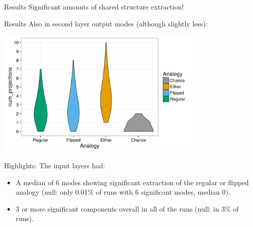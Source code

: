 \documentclass{beamer}
\begin{document}
\begin{frame}{Results}
Significant amounts of shared structure extraction!\\[11pt]
\end{frame}
\begin{frame}{Results}
Also in second layer output modes (although slightly less):
\begin{center}
\includegraphics[width=0.75\textwidth]{../hinton_family_tree/results/output_mode_projections_violin.png} 
\end{center}
\end{frame}

\begin{frame}{Highlights:}
The input layers had:
\begin{itemize}
    \item<1-> A median of 6 modes showing significant extraction of the regular or flipped analogy (null: only 0.01\% of runs with 6 significant modes, median 0).
    \item<2-> 3 or more significant components overall in all of the runs (null: in 3\% of runs).
\end{itemize}
\end{frame}
\end{document}
